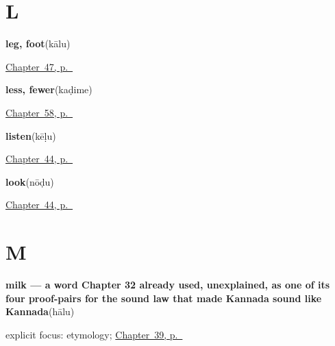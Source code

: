 \section*{L}

\noindent\begin{minipage}[t]{\linewidth}
\raggedright
\textbf{leg, foot}\enspace\emph{}\enspace(kālu)\par
\footnotesize \hyperref[ch:ka-body-more]{Chapter~47, p.~\pageref*{ch:ka-body-more}}
\end{minipage}\par\smallskip

\noindent\begin{minipage}[t]{\linewidth}
\raggedright
\textbf{less, fewer}\enspace\emph{}\enspace(kaḍime)\par
\footnotesize \hyperref[ch:ka-more-replies]{Chapter~58, p.~\pageref*{ch:ka-more-replies}}
\end{minipage}\par\smallskip

\noindent\begin{minipage}[t]{\linewidth}
\raggedright
\textbf{listen}\enspace\emph{}\enspace(kēḷu)\par
\footnotesize \hyperref[ch:ka-see-say]{Chapter~44, p.~\pageref*{ch:ka-see-say}}
\end{minipage}\par\smallskip

\noindent\begin{minipage}[t]{\linewidth}
\raggedright
\textbf{look}\enspace\emph{}\enspace(nōḍu)\par
\footnotesize \hyperref[ch:ka-see-say]{Chapter~44, p.~\pageref*{ch:ka-see-say}}
\end{minipage}\par\smallskip

\section*{M}

\noindent\begin{minipage}[t]{\linewidth}
\raggedright
\textbf{milk — a word Chapter 32 already used, unexplained, as one of its four proof-pairs for the sound law that made Kannada sound like Kannada}\enspace\emph{}\enspace(hālu)\par
\footnotesize explicit focus: etymology; \hyperref[ch:ka-tea-coffee-milk]{Chapter~39, p.~\pageref*{ch:ka-tea-coffee-milk}}
\end{minipage}\par\smallskip

